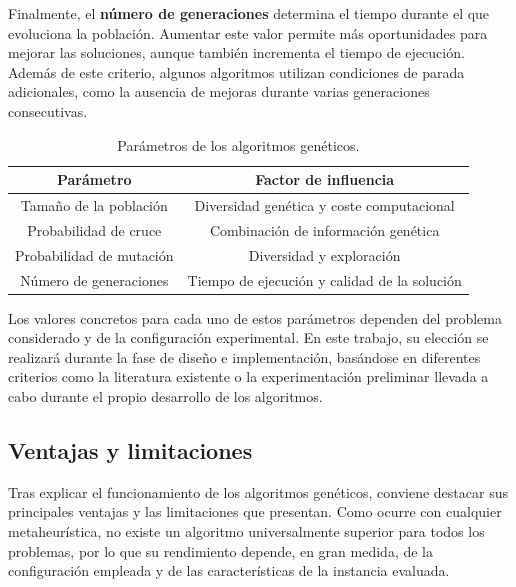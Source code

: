 Finalmente, el \textbf{número de generaciones} determina el tiempo durante el que evoluciona la población. Aumentar este 
valor permite más oportunidades para mejorar las soluciones, aunque también incrementa el tiempo de ejecución. Además de este
criterio, algunos algoritmos utilizan condiciones de parada adicionales, como la ausencia de mejoras durante varias 
generaciones consecutivas.

\begin{table}[ht]
    \renewcommand{\arraystretch}{1.3}
    \caption{Parámetros de los algoritmos genéticos.}
    \label{tab:ga_params}
    \begin{center}
        \begin{tabular}{|c|c|}
            \hline
            \textbf{Parámetro} & \textbf{Factor de influencia} \\
            \hline
            Tamaño de la población & Diversidad genética y coste computacional \\
            \hline
            Probabilidad de cruce & Combinación de información genética \\
            \hline
            Probabilidad de mutación & Diversidad y exploración \\
            \hline
            Número de generaciones & Tiempo de ejecución y calidad de la solución \\
            \hline
        \end{tabular}
    \end{center}
\end{table}

Los valores concretos para cada uno de estos parámetros dependen del problema considerado y de la configuración experimental.
En este trabajo, su elección se realizará durante la fase de diseño e implementación, basándose en diferentes criterios como 
la literatura existente o la experimentación preliminar llevada a cabo durante el propio desarrollo de los algoritmos.

\subsection{Ventajas y limitaciones}
\label{subsec:ga_proscons}

Tras explicar el funcionamiento de los algoritmos genéticos, conviene destacar sus principales ventajas y las limitaciones
que presentan. Como ocurre con cualquier metaheurística, no existe un algoritmo universalmente superior para todos los 
problemas, por lo que su rendimiento depende, en gran medida, de la configuración empleada y de las características de la 
instancia evaluada.

